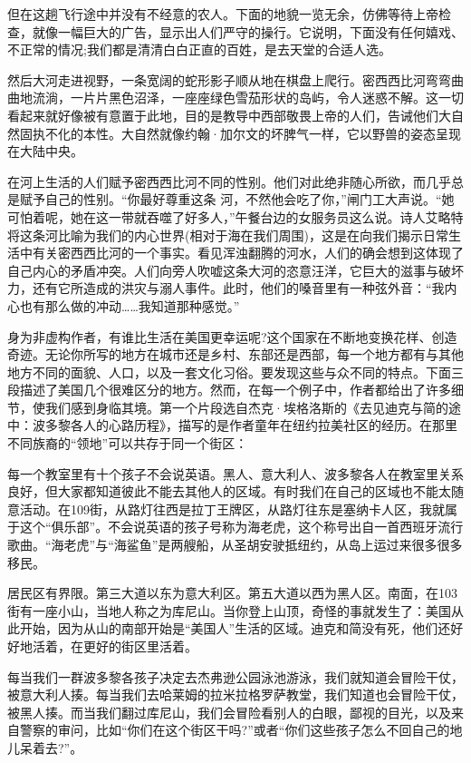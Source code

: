 但在这趟飞行途中并没有不经意的农人。下面的地貌一览无余，仿佛等待上帝检查，就像一幅巨大的广告，显示出人们严守的操行。它说明，下面没有任何嬉戏、不正常的情况;我们都是清清白白正直的百姓，是去天堂的合适人选。

然后大河走进视野，一条宽阔的蛇形影子顺从地在棋盘上爬行。密西西比河弯弯曲曲地流淌，一片片黑色沼泽，一座座绿色雪茄形状的岛屿，令人迷惑不解。这一切看起来就好像被有意置于此地，目的是教导中西部敬畏上帝的人们，告诫他们大自然固执不化的本性。大自然就像约翰·加尔文的坏脾气一样，它以野兽的姿态呈现在大陆中央。

在河上生活的人们赋予密西西比河不同的性别。他们对此绝非随心所欲，而几乎总是赋予自己的性别。“你最好尊重这条
河，不然他会吃了你，”闸门工大声说。“她可怕着呢，她在这一带就吞噬了好多人，”午餐台边的女服务员这么说。诗人艾略特将这条河比喻为我们的内心世界(相对于海在我们周围)，这是在向我们揭示日常生活中有关密西西比河的一个事实。看见浑浊翻腾的河水，人们的确会想到这体现了自己内心的矛盾冲突。人们向旁人吹嘘这条大河的恣意汪洋，它巨大的滋事与破坏力，还有它所造成的洪灾与溺人事件。此时，他们的嗓音里有一种弦外音：“我内心也有那么做的冲动……我知道那种感觉。”

身为非虚构作者，有谁比生活在美国更幸运呢?这个国家在不断地变换花样、创造奇迹。无论你所写的地方在城市还是乡村、东部还是西部，每一个地方都有与其他地方不同的面貌、人口，以及一套文化习俗。要发现这些与众不同的特点。下面三段描述了美国几个很难区分的地方。然而，在每一个例子中，作者都给出了许多细节，使我们感到身临其境。第一个片段选自杰克·埃格洛斯的《去见迪克与简的途中：波多黎各人的心路历程》，描写的是作者童年在纽约拉美社区的经历。在那里不同族裔的“领地”可以共存于同一个街区：

每一个教室里有十个孩子不会说英语。黑人、意大利人、波多黎各人在教室里关系良好，但大家都知道彼此不能去其他人的区域。有时我们在自己的区域也不能太随意活动。在109街，从路灯往西是拉丁王牌区，从路灯往东是塞纳卡人区，我就属于这个“俱乐部”。不会说英语的孩子号称为海老虎，这个称号出自一首西班牙流行歌曲。“海老虎”与“海鲨鱼”是两艘船，从圣胡安驶抵纽约，从岛上运过来很多很多移民。

居民区有界限。第三大道以东为意大利区。第五大道以西为黑人区。南面，在103街有一座小山，当地人称之为库尼山。当你登上山顶，奇怪的事就发生了：美国从此开始，因为从山的南部开始是“美国人”生活的区域。迪克和简没有死，他们还好好地活着，在更好的街区里活着。

每当我们一群波多黎各孩子决定去杰弗逊公园泳池游泳，我们就知道会冒险干仗，被意大利人揍。每当我们去哈莱姆的拉米拉格罗萨教堂，我们知道也会冒险干仗，被黑人揍。而当我们翻过库尼山，我们会冒险看别人的白眼，鄙视的目光，以及来自警察的审问，比如“你们在这个街区干吗?”或者“你们这些孩子怎么不回自己的地儿呆着去?”。

